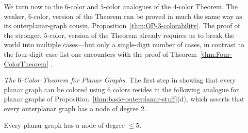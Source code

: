 We turn now to the $6$-color and $5$-color analogues of the $4$-color
Theorem.  The weaker, $6$-color, version of the Theorem can be proved
in much the same way as its outerplanar-graph cousin,
Proposition~\ref{thm:OP-3-colorability}.  The proof of the stronger,
$5$-color, version of the Theorem already requires us to break the
world into multiple cases---but only a single-digit number of cases,
in contrast to the four-digit case list one encounters with the proof
of Theorem~\ref{thm:Four-ColorTheorem} \cite{AppelH77a,AppelH77b}.

\bigskip

{\it The $6$-Color Theorem for Planar Graphs.}
The first step in showing that every planar graph can be colored using
$6$ colors resides in the following analogue for planar graphs of
Proposition~\ref{thm:basic-outerplanar-stuff}(d), which asserts that
every outerplanar graph has a node of degree $2$.

\begin{lemma}
\label{thm:PlanarGraph-degree5}
Every planar graph has a node of degree $\leq 5$.
\end{lemma}

